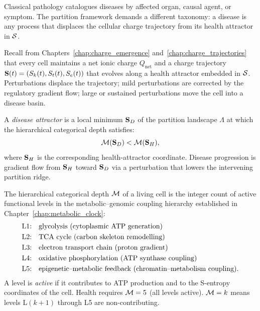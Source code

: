 Classical pathology catalogues diseases by affected organ, causal agent, or
symptom. The partition framework demands a different taxonomy: a disease is
any process that displaces the cellular charge trajectory from its health
attractor in $\mathcal{S}$.

Recall from Chapters~\ref{chap:charge_emergence} and~\ref{chap:charge_trajectories}
that every cell maintains a net ionic charge $Q_{\mathrm{net}}$ and a
charge trajectory $\mathbf{S}(t) = (S_k(t), S_t(t), S_e(t))$ that evolves
along a health attractor embedded in $\mathcal{S}$. Perturbations displace the
trajectory; mild perturbations are corrected by the regulatory gradient flow;
large or sustained perturbations move the cell into a disease basin.

\begin{definition}
\label{def:disease_attractor}
A \emph{disease attractor} is a local minimum $\mathbf{S}_D$ of the partition
landscape $\Lambda$ at which the hierarchical categorical depth satisfies:
\begin{equation}
  \mathcal{M}(\mathbf{S}_D) < \mathcal{M}(\mathbf{S}_H),
\end{equation}
where $\mathbf{S}_H$ is the corresponding health-attractor coordinate.
Disease progression is gradient flow from $\mathbf{S}_H$ toward $\mathbf{S}_D$
via a perturbation that lowers the intervening partition ridge.
\end{definition}

\begin{definition}
\label{def:cell_depth}
The hierarchical categorical depth $\mathcal{M}$ of a living cell is the integer
count of active functional levels in the metabolic--genomic coupling hierarchy
established in Chapter~\ref{chap:metabolic_clock}:
\begin{align}
  \text{L1:} & \quad \text{glycolysis (cytoplasmic ATP generation)} \notag \\
  \text{L2:} & \quad \text{TCA cycle (carbon skeleton remodelling)} \notag \\
  \text{L3:} & \quad \text{electron transport chain (proton gradient)} \notag \\
  \text{L4:} & \quad \text{oxidative phosphorylation (ATP synthase coupling)} \notag \\
  \text{L5:} & \quad \text{epigenetic--metabolic feedback (chromatin--metabolism coupling).} \notag
\end{align}
A level is \emph{active} if it contributes to ATP production and to the
S-entropy coordinates of the cell. Health requires $\mathcal{M} = 5$ (all levels
active). $\mathcal{M} = k$ means levels L$(k+1)$ through L5 are non-contributing.
\end{definition}

